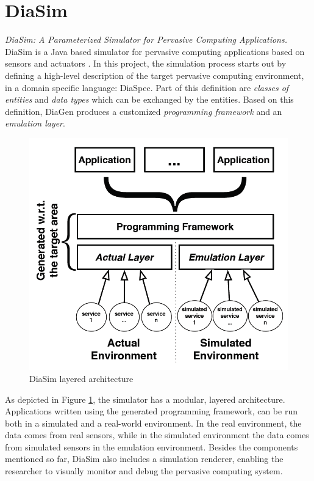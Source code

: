 \section{DiaSim}\label{sec:diasim}
\emph{DiaSim: A Parameterized Simulator for Pervasive Computing Applications.}\\

DiaSim is a Java based simulator for pervasive computing applications based on sensors and actuators \cite{bruneau2013diasim}. In this project, the simulation process starts out by defining a high-level description of the target pervasive computing environment, in a domain specific language: DiaSpec. Part of this definition are \emph{classes of entities} and \emph{data types} which can be exchanged by the entities. Based on this definition, DiaGen produces a customized \emph{programming framework} and an \emph{emulation layer}.\\

\begin{figure}[H]
	\centering
	\includegraphics[width=\linewidth]{gfx/Chapter2/diasim_layered_architecture}
	\caption{DiaSim layered architecture}
	\label{fig:diasim_architecture}
\end{figure}

As depicted in Figure \ref{fig:diasim_architecture}, the simulator has a modular, layered architecture. Applications written using the generated programming framework, can be run both in a simulated and a real-world environment. In the real environment, the data comes from real sensors, while in the simulated environment the data comes from simulated sensors in the emulation environment. Besides the components mentioned so far, DiaSim also includes a simulation renderer, enabling the researcher to visually monitor and debug the pervasive computing system.\\

